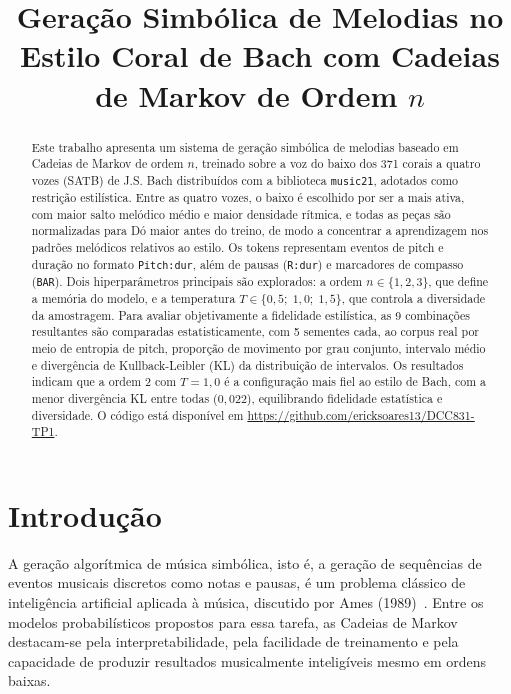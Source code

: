 \documentclass{article}
\title{Geração Simbólica de Melodias no Estilo Coral de Bach com Cadeias de Markov de Ordem $n$}
\begin{document}
\maketitle

\begin{abstract}
  Este trabalho apresenta um sistema de geração simbólica de melodias baseado em
  Cadeias de Markov de ordem $n$, treinado sobre a voz do baixo dos 371 corais a
  quatro vozes (SATB) de J.S. Bach distribuídos com a biblioteca
  \texttt{music21}, adotados como restrição estilística. Entre as quatro vozes,
  o baixo é escolhido por ser a mais ativa, com maior salto melódico médio e
  maior densidade rítmica, e todas as peças são normalizadas para Dó maior antes
  do treino, de modo a concentrar a aprendizagem nos padrões melódicos relativos
  ao estilo. Os tokens representam eventos de pitch e duração no formato
  \texttt{Pitch:dur}, além de pausas (\texttt{R:dur}) e marcadores de compasso
  (\texttt{BAR}). Dois hiperparâmetros principais são explorados: a ordem $n \in
    \{1, 2, 3\}$, que define a memória do modelo, e a temperatura $T \in
    \{0{,}5;\; 1{,}0;\; 1{,}5\}$, que controla a diversidade da amostragem. Para
  avaliar objetivamente a fidelidade estilística, as 9 combinações resultantes
  são comparadas estatisticamente, com 5 sementes cada, ao corpus real por meio
  de entropia de pitch, proporção de movimento por grau conjunto, intervalo
  médio e divergência de Kullback-Leibler (KL) da distribuição de intervalos. Os
  resultados indicam que a ordem 2 com $T=1{,}0$ é a configuração mais fiel ao
  estilo de Bach, com a menor divergência KL entre todas ($0{,}022$),
  equilibrando fidelidade estatística e diversidade. O código está disponível em
  \url{https://github.com/ericksoares13/DCC831-TP1}.
\end{abstract}

\section{Introdução}\label{sec:intro}

A geração algorítmica de música simbólica, isto é, a geração de sequências de
eventos musicais discretos como notas e pausas, é um problema clássico de
inteligência artificial aplicada à música, discutido por Ames
(1989)~\cite{Ames1989:markov}. Entre os modelos probabilísticos propostos para
essa tarefa, as Cadeias de Markov destacam-se pela interpretabilidade, pela
facilidade de treinamento e pela capacidade de produzir resultados musicalmente
inteligíveis mesmo em ordens baixas.
\end{document}
